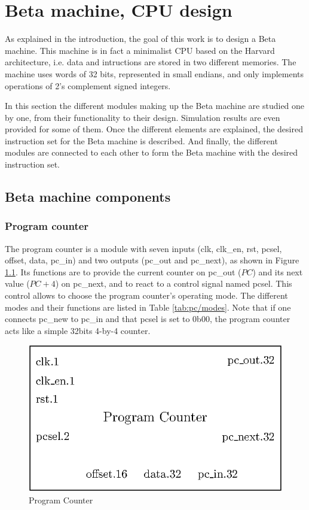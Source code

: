 \chapter{Beta machine, CPU design}

As explained in the introduction, the goal of this work is to design a Beta machine. This machine is 
in fact a minimalist CPU based on the Harvard architecture, i.e. data and intructions are stored in 
two different memories. The machine uses words of 32 bits, represented in small endians, 
and only implements operations of 2's complement signed integers. 

In this section the different modules making up the Beta machine are studied one by one, from 
their functionality to their design. Simulation results are even provided for some of them. Once the 
different elements are explained, the desired instruction set for the Beta machine is
described. And finally, the different modules are connected to each other to form the Beta
machine with the desired instruction set.

\section{Beta machine components}

\subsection{Program counter}

The program counter is a module with seven inputs (clk, clk\_en, rst, pcsel, offset, data, pc\_in) 
and two outputs (pc\_out and pc\_next), as shown in Figure \ref{fig:components/pc}. 
Its functions are to provide the current counter on pc\_out ($PC$) and its 
next value ($PC + 4$) on pc\_next, and to react to a control signal named pcsel. This control 
allows to choose the program counter's operating mode. The different modes and their functions
are listed in Table \ref{tab:pc/modes}. Note that if one connects pc\_new to pc\_in and that pcsel
is set to 0b00, the program counter acts like a simple 32bits 4-by-4 counter.

\begin{figure}[H]
    \centering
    \includegraphics[scale=0.8]{Chapter3-CPU/res/pc}
    \caption{Program Counter}
    \label{fig:components/pc}
\end{figure}

